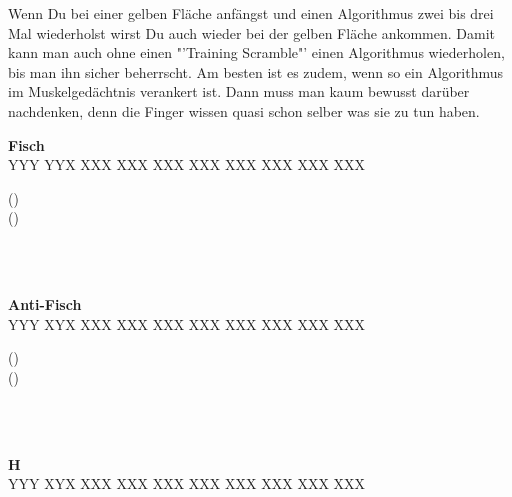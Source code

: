 Wenn Du bei einer gelben Fläche anfängst und einen Algorithmus zwei bis drei Mal wiederholst wirst Du auch wieder bei der gelben Fläche ankommen.
Damit kann man auch ohne einen "'Training Scramble"' einen Algorithmus wiederholen, bis man ihn sicher beherrscht.
Am besten ist es zudem, wenn so ein Algorithmus im Muskelgedächtnis verankert ist.
Dann muss man kaum bewusst darüber nachdenken, denn die Finger wissen quasi schon selber was sie zu tun haben.
\\[1em]
%
\parbox{0.3\linewidth}{
	\centering
	\textbf{Fisch} \\[1ex]
  \RubikCubeGreyAll%
	      {Y}{Y}{Y}
	      {Y}{Y}{X}%
		 {X}{X}{X}
		 {X}{X}{X}%
		 {X}{X}{X}
		 {X}{X}{X}%
		{X}{X}{X}
		{X}{X}{X}%
		{X}{X}{X}
		{X}{X}{X}%
}%
\parbox{0.7\linewidth}{
	() \\[1em] ()
}\\[1em]
 \\[3em]
%
%
\parbox{0.3\linewidth}{
\begin{center}
	\textbf{Anti-Fisch} \\[1ex]
  \RubikCubeGreyAll%
	      {Y}{Y}{Y}
	      {X}{Y}{X}%
		 {X}{X}{X}
		 {X}{X}{X}%
		 {X}{X}{X}
		 {X}{X}{X}%
		{X}{X}{X}
		{X}{X}{X}%
		{X}{X}{X}
		{X}{X}{X}%
\end{center}
}%
\parbox{0.7\linewidth}{
	() \\[1em] ()
}\\[1em]
\\[3em]
%
%
\parbox{0.3\linewidth}{
\begin{center}
  \textbf{H} \\
  \RubikCubeGreyAll%
	      {Y}{Y}{Y}
	      {X}{Y}{X}%
		 {X}{X}{X}
		 {X}{X}{X}%
		 {X}{X}{X}
		 {X}{X}{X}%
		{X}{X}{X}
		{X}{X}{X}%
		{X}{X}{X}
		{X}{X}{X}%
\end{center}
}%
